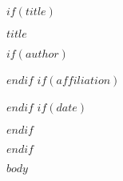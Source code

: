 \documentclass[14pt]{extarticle}
\begin{document}
$if(title)$
\begin{center}
  {\LARGE\bfseries $title$ \par}
  $if(author)$\vspace{0.5em}{\large $author$}\par$endif$
  $if(affiliation)$\vspace{0.3em}{\small $affiliation$}\par$endif$
  $if(date)$\vspace{0.3em}{\small $date$}\par$endif$
\end{center}
\vspace{1em}
$endif$

$body$



\end{document}

